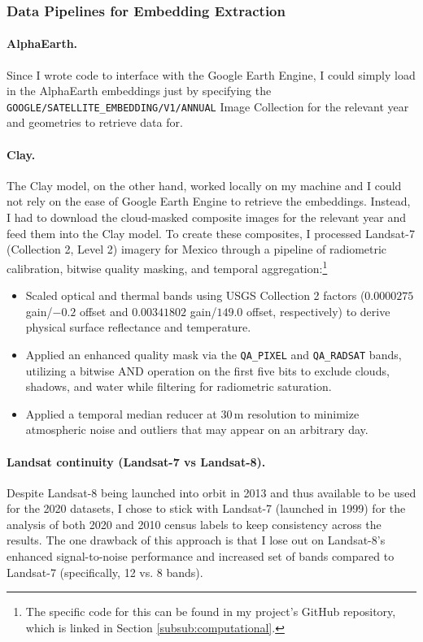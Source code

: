 \documentclass[12pt,letterpaper]{article}
\begin{document}
\subsubsection{Data Pipelines for Embedding Extraction}

\paragraph{AlphaEarth.}
Since I wrote code to interface with the Google Earth Engine, I could simply load in the AlphaEarth embeddings just by specifying the \texttt{GOOGLE/SATELLITE\_EMBEDDING/\allowbreak V1/ANNUAL} Image Collection for the relevant year and geometries to retrieve data for.

\paragraph{Clay.}
The Clay model, on the other hand, worked locally on my machine and I could not rely on the ease of Google Earth Engine to retrieve the embeddings. Instead, I had to download the cloud-masked composite images for the relevant year and feed them into the Clay model. To create these composites, I processed Landsat-7 (Collection 2, Level 2) imagery for Mexico through a pipeline of radiometric calibration, bitwise quality masking, and temporal aggregation:\footnote{The specific code for this can be found in my project's GitHub repository, which is linked in Section \ref{subsub:computational}.}
\begin{itemize}
  \item Scaled optical and thermal bands using USGS Collection 2 factors ($0.0000275$ gain/$-0.2$ offset and $0.00341802$ gain/$149.0$ offset, respectively) to derive physical surface reflectance and temperature.
  \item Applied an enhanced quality mask via the \texttt{QA\_PIXEL} and \texttt{QA\_RADSAT} bands, utilizing a bitwise AND operation on the first five bits to exclude clouds, shadows, and water while filtering for radiometric saturation.
  \item Applied a temporal median reducer at $30\,\mathrm{m}$ resolution to minimize atmospheric noise and outliers that may appear on an arbitrary day.
\end{itemize}

\paragraph{Landsat continuity (Landsat-7 vs Landsat-8).}
Despite Landsat-8 being launched into orbit in 2013 and thus available to be used for the 2020 datasets, I chose to stick with Landsat-7 (launched in 1999) for the analysis of both 2020 and 2010 census labels to keep consistency across the results. The one drawback of this approach is that I lose out on Landsat-8's enhanced signal-to-noise performance and increased set of bands compared to Landsat-7 (specifically, 12 vs. 8 bands). 
\end{document}
